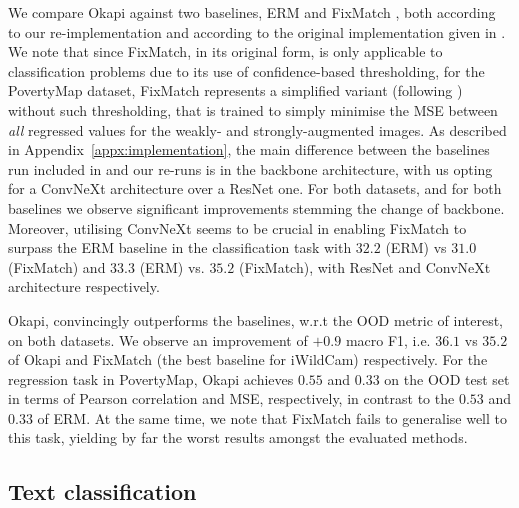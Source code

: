 We compare Okapi against two baselines, \ac{ERM} and FixMatch \citep{sohn2020fixmatch},
both according to our re-implementation and according to the original implementation given in
\citet{SagWeiLeeGaoetal22}.
%
We note that since FixMatch, in its original form, is only applicable to classification problems
due to its use of confidence-based thresholding, for the PovertyMap dataset, FixMatch represents a
simplified variant (following \citep{SagWeiLeeGaoetal22}) without such thresholding, that is
trained to simply minimise the MSE between \emph{all} regressed values for the weakly- and
strongly-augmented images.
%
As described in Appendix~\ref{appx:implementation}, the main difference between the baselines run
included in \citet{SagWeiLeeGaoetal22} and our re-runs is in the backbone architecture, with us
opting for a ConvNeXt \citep{liu2022convnet} architecture over a ResNet one.
%
For both datasets, and for both baselines we observe significant improvements stemming the change
of backbone.
%
%
Moreover, utilising ConvNeXt seems to be crucial in enabling FixMatch to surpass the \ac{ERM} baseline
in the classification task with $32.2$ (ERM) vs $31.0$ (FixMatch) and $33.3$ (ERM) vs. $35.2$
(FixMatch), with ResNet and ConvNeXt architecture respectively. 
% 

Okapi, convincingly outperforms the baselines, w.r.t the OOD metric of interest, on both datasets. 
%
We observe an improvement of $+0.9$ macro F1, i.e. $36.1$ vs $35.2$ of Okapi and FixMatch (the best
baseline for iWildCam) respectively. For the regression task in PovertyMap, Okapi achieves $0.55$
and $0.33$ on the OOD test set in terms of Pearson correlation and MSE, respectively, in contrast
to the $0.53$ and $0.33$ of \ac{ERM}.
%
At the same time, we note that FixMatch fails to generalise well to this task, yielding by far the
worst results amongst the evaluated methods.

\subsection{Text classification}

